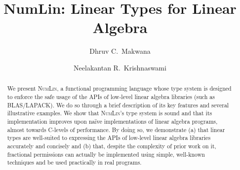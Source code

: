 \documentclass[a4paper,UKenglish]{lipics-v2019}
\title{NumLin: Linear Types for Linear Algebra}
\author{Dhruv C.~Makwana}{Unaffiliated \url{dhruvmakwana.com} }{dcm41@cam.ac.uk}{https://orcid.org/0000-0001-7220-4991}{}
\author{Neelakantan R.~Krishnaswami}{Department of Computer Science and Technology, University of Cambridge, United Kingdom}{nk480@cl.cam.ac.uk}{https://orcid.org/0000-0003-2838-5865}{}
\newcommand{\lang}{\textsc{NumLin}}
\begin{document}
\maketitle%

\begin{abstract}
    We present \lang, a functional programming language whose type system is
    designed to enforce the safe usage of the APIs of low-level linear algebra
    libraries (such as BLAS/LAPACK). We do so through a brief description of
    its key features and several illustrative examples. We show that \lang's
    type system is sound and that its implementation improves upon na{\"i}ve
    implementations of linear algebra programs, almost towards C-levels of
    performance. By doing so, we demonstrate (a) that linear types are
    well-suited to expressing the APIs of low-level linear algebra libraries
    accurately and concisely and (b) that, despite the complexity of prior work
    on it, fractional permissions can actually be implemented using simple,
    well-known techniques and be used practically in real programs.
\end{abstract}











\clearpage


\clearpage\appendix
\end{document}
